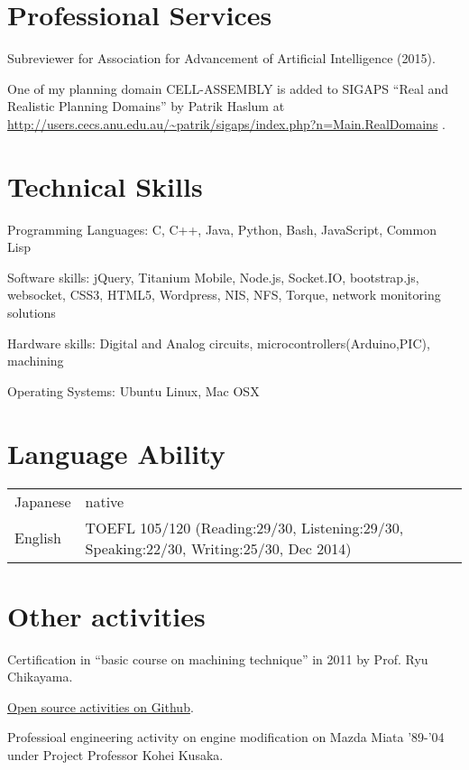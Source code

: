 \documentclass[a4paper]{article}
\begin{document}
\renewcommand{\refname}{Publications}

\let\uline\relax
\nocite{Asai2014}
\nocite{Asai2014b}
\nocite{Asai2015}




\section{Professional Services}

Subreviewer for Association for Advancement of Artificial Intelligence (2015).

One of my planning domain CELL-ASSEMBLY is added to SIGAPS ``Real and
Realistic Planning Domains'' by Patrik Haslum at
\url{http://users.cecs.anu.edu.au/~patrik/sigaps/index.php?n=Main.RealDomains}
.

\section{Technical Skills}

\begin{CV}
 \item[Programming Languages:] C, C++, Java, Python, Bash, JavaScript, Common Lisp
 \item[Software skills:] jQuery, Titanium Mobile,
 Node.js, Socket.IO, bootstrap.js, websocket, CSS3, HTML5, Wordpress, NIS, NFS,
 Torque, network monitoring solutions
 \item[Hardware skills:] Digital and Analog circuits, microcontrollers(Arduino,PIC), machining
 \item[Operating Systems:] Ubuntu Linux, Mac OSX
\end{CV}

\section{Language Ability}
\begin{table}[h] %
\begin{tabular}{ll}
Japanese & native \\
English  & TOEFL 105/120 (Reading:29/30, Listening:29/30, Speaking:22/30, Writing:25/30, Dec 2014)
\end{tabular}
\end{table}

\section{Other activities}

Certification in ``basic course on machining technique'' in 2011 by Prof. Ryu Chikayama.

\href{https://github.com/guicho271828}{Open source activities on Github}.

Professioal engineering activity on engine modification
on Mazda Miata '89-'04 under Project Professor Kohei Kusaka.
\end{document}
